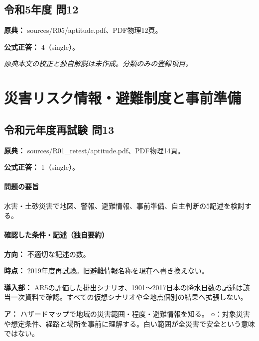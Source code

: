 \subsection{令和5年度 問12}
\label{q:r05-reg-apt-12}

\noindent\textbf{原典：} sources/R05/aptitude.pdf、PDF物理12頁。

\textbf{公式正答：} 4（single）。

\par\textit{原典本文の校正と独自解説は未作成。分類のみの登録項目。}

\section{災害リスク情報・避難制度と事前準備}

\subsection{令和元年度再試験 問13}
\label{q:r01-ret-apt-13}

\noindent\textbf{原典：} sources/R01\_retest/aptitude.pdf、PDF物理14頁。

\textbf{公式正答：} 1（single）。

\paragraph{問題の要旨} 水害・土砂災害で地図、警報、避難情報、事前準備、自主判断の5記述を検討する。

\paragraph{確認した条件・記述（独自要約）}\mbox{}\par

\noindent\textbf{方向：} 不適切な記述の数。\par

\noindent\textbf{時点：} 2019年度再試験。旧避難情報名称を現在へ書き換えない。\par

\noindent\textbf{導入部：} AR5の評価した排出シナリオ、1901〜2017日本の降水日数の記述は該当一次資料で確認。すべての仮想シナリオや全地点個別の結果へ拡張しない。\par

\noindent\textbf{ア：} ハザードマップで地域の災害範囲・程度・避難情報を知る。 ○：対象災害や想定条件、経路と場所を事前に理解する。白い範囲が全災害で安全という意味ではない。\par

